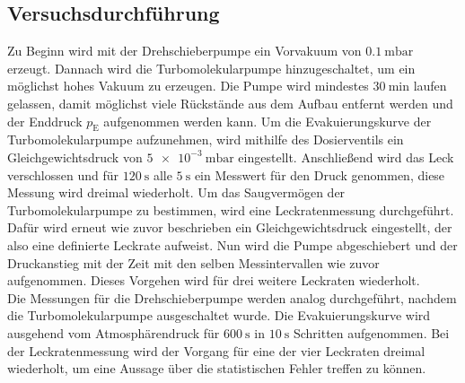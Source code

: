 \subsection{Versuchsdurchführung}
Zu Beginn wird mit der Drehschieberpumpe ein Vorvakuum von $\qty{0.1}{\milli\bar}$ erzeugt. Dannach wird die Turbomolekularpumpe hinzugeschaltet,
um ein möglichst hohes Vakuum zu erzeugen. Die Pumpe wird mindestes $\qty{30}{\minute}$ laufen gelassen, damit möglichst viele
Rückstände aus dem Aufbau entfernt werden und der Enddruck $p_{\text{E}}$ aufgenommen werden kann.
Um die Evakuierungskurve der Turbomolekularpumpe aufzunehmen, wird mithilfe des Dosierventils ein Gleichgewichtsdruck von $\qty{5e-3}{\milli\bar}$
eingestellt. Anschließend wird das Leck verschlossen und für $\qty{120}{\second}$ alle $\qty{5}{\second}$ ein Messwert für den Druck
genommen, diese Messung wird dreimal wiederholt.
Um das Saugvermögen der Turbomolekularpumpe zu bestimmen, wird eine Leckratenmessung durchgeführt. Dafür wird erneut wie zuvor
beschrieben ein Gleichgewichtsdruck eingestellt, der also eine definierte Leckrate aufweist. Nun wird die Pumpe
abgeschiebert und der Druckanstieg mit der Zeit mit den selben Messintervallen wie zuvor aufgenommen. Dieses Vorgehen wird für
drei weitere Leckraten wiederholt.\\
Die Messungen für die Drehschieberpumpe werden analog durchgeführt, nachdem die Turbomolekularpumpe ausgeschaltet wurde.
Die Evakuierungskurve wird ausgehend vom Atmosphärendruck für $\qty{600}{\second}$ in $\qty{10}{\second}$ Schritten aufgenommen.
Bei der Leckratenmessung wird der Vorgang für eine der vier Leckraten dreimal wiederholt, um eine Aussage über die
statistischen Fehler treffen zu können.
